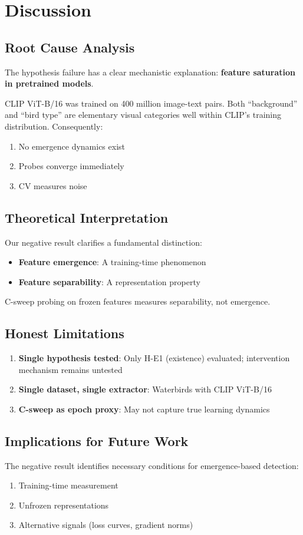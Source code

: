 \section{Discussion}

\subsection{Root Cause Analysis}

The hypothesis failure has a clear mechanistic explanation: \textbf{feature saturation in pretrained models}.

CLIP ViT-B/16 was trained on 400 million image-text pairs. Both ``background'' and ``bird type'' are elementary visual categories well within CLIP's training distribution. Consequently:

\begin{enumerate}
    \item No emergence dynamics exist
    \item Probes converge immediately
    \item CV measures noise
\end{enumerate}

\subsection{Theoretical Interpretation}

Our negative result clarifies a fundamental distinction:

\begin{itemize}
    \item \textbf{Feature emergence}: A training-time phenomenon
    \item \textbf{Feature separability}: A representation property
\end{itemize}

C-sweep probing on frozen features measures separability, not emergence.

\subsection{Honest Limitations}

\begin{enumerate}
    \item \textbf{Single hypothesis tested}: Only H-E1 (existence) evaluated; intervention mechanism remains untested
    \item \textbf{Single dataset, single extractor}: Waterbirds with CLIP ViT-B/16
    \item \textbf{C-sweep as epoch proxy}: May not capture true learning dynamics
\end{enumerate}

\subsection{Implications for Future Work}

The negative result identifies necessary conditions for emergence-based detection:

\begin{enumerate}
    \item Training-time measurement
    \item Unfrozen representations
    \item Alternative signals (loss curves, gradient norms)
\end{enumerate}
